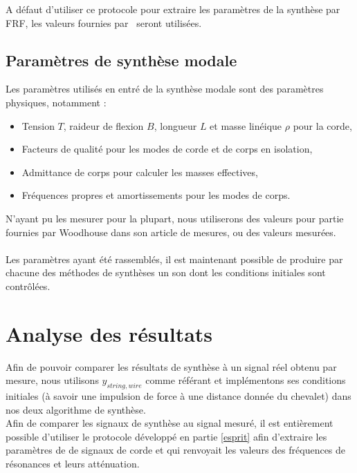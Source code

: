 A défaut d'utiliser ce protocole pour extraire les paramètres de la synthèse par FRF, les valeurs fournies par~\textcite{woodhouse2004plucked} seront utilisées.

\subsection{Paramètres de synthèse modale}

Les paramètres utilisés en entré de la synthèse modale sont des paramètres physiques, notamment :
\begin{itemize}
 \item Tension \( T \), raideur de flexion \( B \), longueur \( L \) et
  masse linéique \( \rho \) pour la corde,
 \item Facteurs de qualité pour les modes de corde et de corps en isolation,
 \item Admittance de corps pour calculer les masses effectives,
 \item Fréquences propres et amortissements pour les modes de corps.
\end{itemize}
N'ayant pu les mesurer pour la plupart, nous utiliserons des valeurs pour
partie fournies par Woodhouse dans son article de mesures,
ou des valeurs mesurées.
\\\\

Les paramètres ayant été rassemblés, il est maintenant possible de produire par chacune des méthodes de synthèses un son dont les conditions initiales sont contrôlées.

\section{Analyse des résultats}
Afin de pouvoir comparer les résultats de synthèse à un signal réel obtenu par mesure, nous utilisons $y_{string,wire}$ comme référant et implémentons ses conditions initiales (à savoir une impulsion de force à une distance donnée du chevalet) dans nos deux algorithme de synthèse.\\
Afin de comparer les signaux de synthèse au signal mesuré, il est entièrement possible d'utiliser le protocole développé en partie \ref{esprit} afin d'extraire les paramètres de de signaux de corde et qui renvoyait les valeurs des fréquences de résonances et leurs atténuation.\\


